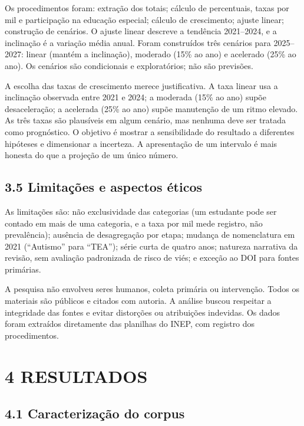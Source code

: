 Os procedimentos foram: extração dos totais; cálculo de percentuais,
taxas por mil e participação na educação especial; cálculo de
crescimento; ajuste linear; construção de cenários. O ajuste linear
descreve a tendência 2021--2024, e a inclinação é a variação média
anual. Foram construídos três cenários para 2025--2027: linear (mantém a
inclinação), moderado (15\% ao ano) e acelerado (25\% ao ano). Os
cenários são condicionais e exploratórios; não são previsões.

A escolha das taxas de crescimento merece justificativa. A taxa linear
usa a inclinação observada entre 2021 e 2024; a moderada (15\% ao ano)
supõe desaceleração; a acelerada (25\% ao ano) supõe manutenção de um
ritmo elevado. As três taxas são plausíveis em algum cenário, mas
nenhuma deve ser tratada como prognóstico. O objetivo é mostrar a
sensibilidade do resultado a diferentes hipóteses e dimensionar a
incerteza. A apresentação de um intervalo é mais honesta do que a
projeção de um único número.

\subsection{3.5 Limitações e aspectos
éticos}\label{limitauxe7uxf5es-e-aspectos-uxe9ticos}

As limitações são: não exclusividade das categorias (um estudante pode
ser contado em mais de uma categoria, e a taxa por mil mede registro,
não prevalência); ausência de desagregação por etapa; mudança de
nomenclatura em 2021 (``Autismo'' para ``TEA''); série curta de quatro
anos; natureza narrativa da revisão, sem avaliação padronizada de risco
de viés; e exceção ao DOI para fontes primárias.

A pesquisa não envolveu seres humanos, coleta primária ou intervenção.
Todos os materiais são públicos e citados com autoria. A análise buscou
respeitar a integridade das fontes e evitar distorções ou atribuições
indevidas. Os dados foram extraídos diretamente das planilhas do INEP,
com registro dos procedimentos.

\section{4 RESULTADOS}\label{resultados}

\subsection{4.1 Caracterização do
corpus}\label{caracterizauxe7uxe3o-do-corpus}

